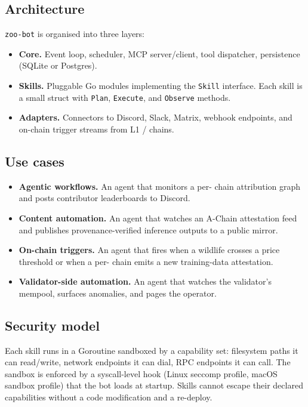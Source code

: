 \subsection{Architecture}

\texttt{zoo-bot} is organised into three layers:

\begin{itemize}[leftmargin=1.2em]
  \item \textbf{Core.} Event loop, scheduler, MCP server/client,
        tool dispatcher, persistence (SQLite or Postgres).
  \item \textbf{Skills.} Pluggable Go modules implementing the
        \texttt{Skill} interface. Each skill is a small struct with
        \texttt{Plan}, \texttt{Execute}, and \texttt{Observe}
        methods.
  \item \textbf{Adapters.} Connectors to Discord, Slack, Matrix,
        webhook endpoints, and on-chain trigger streams from \Zoo{}
        L1 / \Lux{} chains.
\end{itemize}

\subsection{Use cases}

\begin{itemize}[leftmargin=1.2em]
  \item \textbf{Agentic workflows.} An agent that monitors a per-\LLM{}
        chain attribution graph and posts contributor leaderboards to
        Discord.
  \item \textbf{Content automation.} An agent that watches an A-Chain
        attestation feed and publishes provenance-verified inference
        outputs to a public mirror.
  \item \textbf{On-chain triggers.} An agent that fires when a wildlife
        \NFT{} crosses a price threshold or when a per-\LLM{} chain
        emits a new training-data attestation.
  \item \textbf{Validator-side automation.} An agent that watches the
        \Zoo{} validator's mempool, surfaces anomalies, and pages the
        operator.
\end{itemize}

\subsection{Security model}

Each skill runs in a Goroutine sandboxed by a capability set: filesystem
paths it can read/write, network endpoints it can dial, RPC endpoints
it can call. The sandbox is enforced by a syscall-level hook (Linux
seccomp profile, macOS sandbox profile) that the bot loads at startup.
Skills cannot escape their declared capabilities without a code
modification and a re-deploy.

